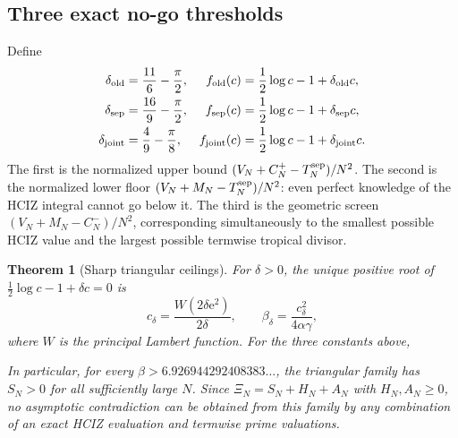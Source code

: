 \documentclass[11pt]{article}
\newcommand{\e}{\mathrm e}
\newcommand{\1}{\mathbf 1}
\theoremstyle{plain}
\newtheorem{theorem}{Theorem}[section]
\theoremstyle{definition}
\theoremstyle{remark}
\begin{document}
\subsection{Three exact no-go thresholds}

Define
\begin{align}
 \delta_{\rm old}&=\frac{11}{6}-\frac\pi2,
 &f_{\rm old}(c)&=\frac12\log c-1+\delta_{\rm old}c,
 \label{eq:f-old}\\
 \delta_{\rm sep}&=\frac{16}{9}-\frac\pi2,
 &f_{\rm sep}(c)&=\frac12\log c-1+\delta_{\rm sep}c,
 \label{eq:f-sep}\\
 \delta_{\rm joint}&=\frac49-\frac\pi8,
 &f_{\rm joint}(c)&=\frac12\log c-1+\delta_{\rm joint}c.
 \label{eq:f-joint}
\end{align}
The first is the normalized upper bound
$(V_N+C_N^+-T_N^{\rm sep})/N^2$.  The second is the normalized lower floor
$(V_N+M_N-T_N^{\rm sep})/N^2$: even perfect knowledge of the HCIZ integral
cannot go below it.  The third is the geometric screen
$(V_N+M_N-C_N^-)/N^2$, corresponding simultaneously to the smallest possible
HCIZ value and the largest possible termwise tropical divisor.

\begin{theorem}[Sharp triangular ceilings]\label{thm:triangular-ceilings}
For $\delta>0$, the unique positive root of
$\frac12\log c-1+\delta c=0$ is
\begin{equation}\label{eq:Lambert-root}
 c_\delta=\frac{W(2\delta\e^2)}{2\delta},
 \qquad
 \beta_\delta=\frac{c_\delta^2}{4\alpha\gamma},
\end{equation}
where $W$ is the principal Lambert function.  For the three constants above,
\begin{center}
\end{center}
In particular, for every $\beta>6.926944292408383\ldots$, the triangular
family has $S_N>0$ for all sufficiently large $N$.  Since
$\Xi_N=S_N+H_N+A_N$ with $H_N,A_N\ge0$, no asymptotic contradiction can be
obtained from this family by any combination of an exact HCIZ evaluation and
termwise prime valuations.
\end{theorem}
\end{document}
